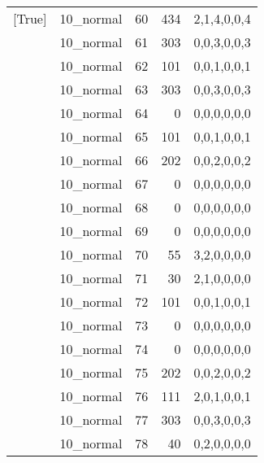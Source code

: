\begin{tabular}{llrrl}
 [True]          & 10\_normal           &            60 &                   434 & 2,1,4,0,0,4   \\
 [True]          & 10\_normal           &            61 &                   303 & 0,0,3,0,0,3   \\
 [True]          & 10\_normal           &            62 &                   101 & 0,0,1,0,0,1   \\
 [True]          & 10\_normal           &            63 &                   303 & 0,0,3,0,0,3   \\
 [True]          & 10\_normal           &            64 &                     0 & 0,0,0,0,0,0   \\
 [True]          & 10\_normal           &            65 &                   101 & 0,0,1,0,0,1   \\
 [True]          & 10\_normal           &            66 &                   202 & 0,0,2,0,0,2   \\
 [True]          & 10\_normal           &            67 &                     0 & 0,0,0,0,0,0   \\
 [True]          & 10\_normal           &            68 &                     0 & 0,0,0,0,0,0   \\
 [True]          & 10\_normal           &            69 &                     0 & 0,0,0,0,0,0   \\
 [True]          & 10\_normal           &            70 &                    55 & 3,2,0,0,0,0   \\
 [True]          & 10\_normal           &            71 &                    30 & 2,1,0,0,0,0   \\
 [True]          & 10\_normal           &            72 &                   101 & 0,0,1,0,0,1   \\
 [True]          & 10\_normal           &            73 &                     0 & 0,0,0,0,0,0   \\
 [True]          & 10\_normal           &            74 &                     0 & 0,0,0,0,0,0   \\
 [True]          & 10\_normal           &            75 &                   202 & 0,0,2,0,0,2   \\
 [True]          & 10\_normal           &            76 &                   111 & 2,0,1,0,0,1   \\
 [True]          & 10\_normal           &            77 &                   303 & 0,0,3,0,0,3   \\
 [True]          & 10\_normal           &            78 &                    40 & 0,2,0,0,0,0   \\

\end{tabular}
